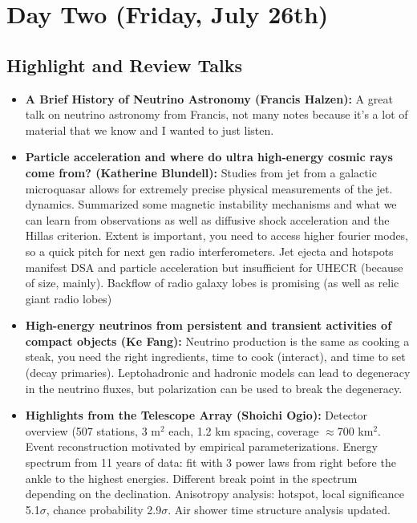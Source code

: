 \section{Day Two (Friday, July 26th)}
\subsection{Highlight and Review Talks}
\begin{itemize}
    \item \textbf{A Brief History of Neutrino Astronomy (Francis Halzen):} A great talk on neutrino astronomy from Francis, not many notes because it's a lot of material that we know and I wanted to just listen.
    \item \textbf{Particle acceleration and where do ultra high-energy cosmic rays come from? (Katherine Blundell):} Studies from jet from a galactic microquasar allows for extremely precise physical measurements of the jet. dynamics. Summarized some magnetic instability mechanisms and what we can learn from observations as well as diffusive shock acceleration and the Hillas criterion. Extent is important, you need to access higher fourier modes, so a quick pitch for next gen radio interferometers. Jet ejecta and hotspots manifest DSA and particle acceleration but insufficient for UHECR (because of size, mainly). Backflow of radio galaxy lobes is promising (as well as relic giant radio lobes)
    \item \textbf{High-energy neutrinos from persistent and transient activities of compact objects (Ke Fang):} Neutrino production is the same as cooking a steak, you need the right ingredients, time to cook (interact), and time to set (decay primaries). Leptohadronic and hadronic models can lead to degeneracy in the neutrino fluxes, but polarization can be used to break the degeneracy. 
    \item \textbf{Highlights from the Telescope Array (Shoichi Ogio):} Detector overview (507 stations, 3 m$^2$ each, 1.2 km spacing, coverage $\approx$700 km$^2$. Event reconstruction motivated by empirical parameterizations. Energy spectrum from 11 years of data: fit with 3 power laws from right before the ankle to the highest energies. Different break point in the spectrum depending on the declination. Anisotropy analysis: hotspot, local significance 5.1$\sigma$, chance probability 2.9$\sigma$. Air shower time structure analysis updated. 

\end{itemize}

